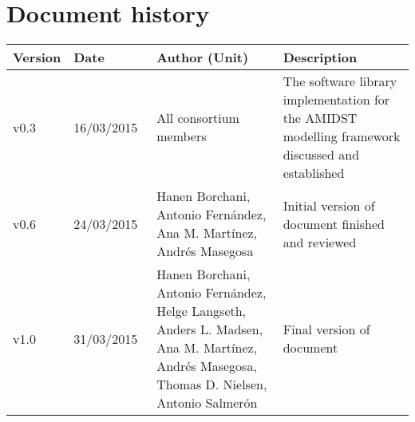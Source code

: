 \documentclass[11pt, oneside]{article}   	%
\numberwithin{figure}{section}
\numberwithin{equation}{section}
\numberwithin{table}{section}
\begin{document}


\tableofcontents

\newpage

\section*{Document history}

\begin{table}[htbp]
  \centering
  \begin{tabularx}{\linewidth}{|p{13mm}| p{18mm}| X | X |} \hline
    {\bf Version} & {\bf Date} & {\bf Author (Unit)} & {\bf Description} \\ \hline
    v0.3 & 16/03/2015~ & All consortium members & The software library implementation for the AMIDST modelling framework discussed and established \\ \hline
    v0.6 & 24/03/2015~ & Hanen Borchani, Antonio Fern\'andez, Ana M. Mart\'inez, Andr\'es Masegosa & Initial version of document finished and reviewed  \\ \hline
    v1.0 & 31/03/2015~ & Hanen Borchani, Antonio Fern\'andez, Helge Langseth, Anders L. Madsen, Ana M. Mart\'inez, Andr\'es Masegosa, Thomas D. Nielsen, Antonio Salmer\'on & Final version of document  \\ \hline
  \end{tabularx}
\end{table}

\newpage



\newpage












\end{document}
